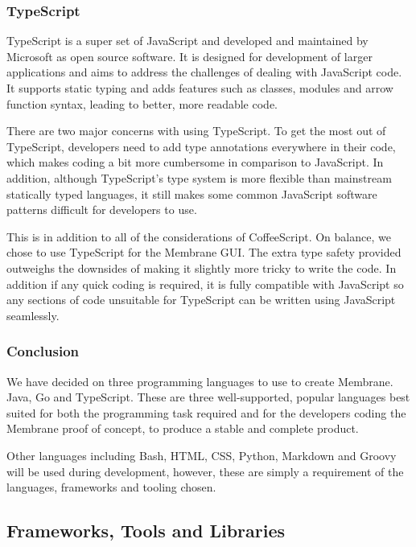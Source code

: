 \documentclass[11pt, a4paper, twocolumn, twoside]{report}
\begin{document}
\subsubsection{TypeScript} \label{sec:typescript}

TypeScript is a super set of JavaScript and developed and maintained by Microsoft as open source software. It is designed for development of larger applications and aims to address the challenges of dealing with JavaScript code. It supports static typing and adds features such as classes, modules and arrow function syntax, leading to better, more readable code. \citep{typescript2017site}

There are two major concerns with using TypeScript. To get the most out of TypeScript, developers need to add type annotations everywhere in their code, which makes coding a bit more cumbersome in comparison to JavaScript. In addition, although TypeScript's type system is more flexible than mainstream statically typed languages, it still makes some common JavaScript software patterns difficult for developers to use. \citep{dataart2017site}

This is in addition to all of the considerations of CoffeeScript. On balance, we chose to use TypeScript for the Membrane GUI. The extra type safety provided outweighs the downsides of making it slightly more tricky to write the code. In addition if any quick coding is required, it is fully compatible with JavaScript so any sections of code unsuitable for TypeScript can be written using JavaScript seamlessly.

\subsubsection{Conclusion}

We have decided on three programming languages to use to create Membrane. Java, Go and TypeScript. These are three well-supported, popular languages best suited for both the programming task required and for the developers coding the Membrane proof of concept, to produce a stable and complete product.

Other languages including Bash, HTML, CSS, Python, Markdown and Groovy will be used during development, however, these are simply a requirement of the languages, frameworks and tooling chosen.

\subsection{Frameworks, Tools and Libraries}
\end{document}

